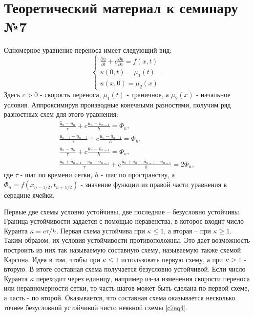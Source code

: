 \section{Теоретический материал к семинару №7}
Одномерное уравнение переноса имеет следующий вид:
\begin{equation} \label{c7eq1}
	\begin{cases}
		\displaystyle \frac{\partial u}{\partial t} + c \frac{\partial u}{\partial x} = f(x,t) \\
		u(0,t) = \mu_1(t) \\
		u(x,0) = \mu_2(x)
	\end{cases}.
\end{equation}
Здесь $c > 0$ - скорость переноса, $\mu_1(t)$ - граничное, а $\mu_2(x)$ - начальное условия. Аппроксимируя производные конечными разностями, получим ряд разностных схем для этого уравнения:
\begin{align}
	\frac{\hat{u}_n - u_n}{\tau} + c \frac{u_n - u_{n-1}}{h} = \Phi_n, \label{c7eq2} \\
	\frac{\hat{u}_{n-1} - u_{n-1}}{\tau} + c \frac{\hat{u}_n - \hat{u}_{n-1}}{h} = \Phi_n, \label{c7eq3} \\
	\frac{\hat{u}_n - u_n}{\tau} +  c \frac{\hat{u}_n - \hat{u}_{n-1}}{h} = \Phi_n, \label{c7eq4} \\
	\frac{\hat{u}_n + \hat{u}_{n-1} - u_n - u_{n-1}}{\tau} + c \frac{\hat{u}_n + u_n - \hat{u}_{n-1} - u_{n-1}}{h} = 2 \Phi_n, \label{c7eq5}
\end{align}
где $\tau$ - шаг по времени сетки, $h$ - шаг по пространству, а $\Phi_n = f(x_{n-1/2}, t_{n+1/2})$ - значение функции из правой части уравнения в середине ячейки.

Первые две схемы условно устойчивы, две последние – безусловно устойчивы. Граница устойчивости задается с помощью неравенства, в которое входит число Куранта $\kappa = c\tau/h$. Первая схема устойчива при $\kappa \leq 1$, а вторая – при $\kappa \geq 1$. Таким образом, их условия устойчивости противоположны. Это дает возможность построить из них так называемую составную схему, называемую также схемой Карсона. Идея в том, чтобы при $\kappa \leq 1$ использовать первую схему, а при $\kappa \geq 1$ - вторую. В итоге составная схема получается безусловно устойчивой. Если число Куранта $\kappa$ переходит через единицу, например из-за изменения скорости переноса или неравномерности сетки, то часть шагов может быть сделана по первой схеме, а часть - по второй. Оказывается, что составная схема оказывается несколько точнее безусловной устойчивой чисто неявной схемы \eqref{c7eq4}.

